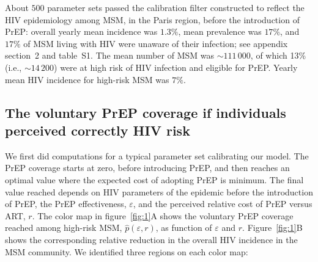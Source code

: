 \documentclass[preprint,review,12pt]{article}			%
\begin{document}
About $500$ parameter sets passed the calibration filter constructed to reflect the HIV epidemiology among MSM, in the Paris region, before the introduction of PrEP: overall yearly mean incidence was $1.3\%$, mean prevalence was $17\%$, and $17\%$ of MSM living with HIV were unaware of their infection; see appendix section~2 and table~S1. The mean number of MSM was $\sim 111\,000$, of which 13\% (i.e., $\sim 14\,200$) were at high risk of HIV infection and eligible for PrEP. Yearly mean HIV incidence for high-risk MSM was $7\%$. 


\subsection{The voluntary PrEP coverage if individuals perceived correctly HIV risk} \label{subsec:VoluntaryPrEP} 
 
We first did computations for a typical parameter set calibrating our model. The PrEP coverage starts at zero, before introducing PrEP, and then reaches an optimal value where the expected cost of adopting PrEP is minimum. The final value reached depends on HIV parameters of the epidemic before the introduction of PrEP, the PrEP effectiveness, $\varepsilon$, and the perceived relative cost of PrEP versus ART, $r$. The color map in figure~\ref{fig:1}A shows the voluntary PrEP coverage reached among high-risk MSM, $\hat{p}(\varepsilon,r)$, as function of $\varepsilon$ and $r$. Figure~\ref{fig:1}B shows the corresponding relative reduction in the overall HIV incidence in the MSM community. We identified three regions on each color map:
\end{document}
